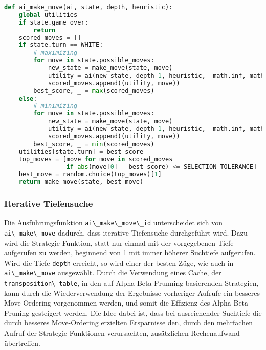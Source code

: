 \begin{lstlisting}[language=Python]
def ai_make_move(ai, state, depth, heuristic):
    global utilities
    if state.game_over:
        return
    scored_moves = []
    if state.turn == WHITE:
        # maximizing
        for move in state.possible_moves:
            new_state = make_move(state, move)
            utility = ai(new_state, depth-1, heuristic, -math.inf, math.inf)
            scored_moves.append((utility, move))
        best_score, _ = max(scored_moves)
    else:
        # minimizing
        for move in state.possible_moves:
            new_state = make_move(state, move)
            utility = ai(new_state, depth-1, heuristic, -math.inf, math.inf)
            scored_moves.append((utility, move))
        best_score, _ = min(scored_moves)
    utilities[state.turn] = best_score
    top_moves = [move for move in scored_moves
                 if abs(move[0] - best_score) <= SELECTION_TOLERANCE]
    best_move = random.choice(top_moves)[1]
    return make_move(state, best_move)
\end{lstlisting}

\hypertarget{iterative-tiefensuche}{%
\subsubsection{Iterative Tiefensuche}\label{iterative-tiefensuche}}

Die Ausführungsfunktion \passthrough{\lstinline!ai\_make\_move\_id!}
unterscheidet sich von \passthrough{\lstinline!ai\_make\_move!} dadurch,
dass iterative Tiefensuche durchgeführt wird. Dazu wird die
Strategie-Funktion, statt nur einmal mit der vorgegebenen Tiefe
aufgerufen zu werden, beginnend von 1 mit immer höherer Suchtiefe
aufgerufen. Wird die Tiefe \passthrough{\lstinline!depth!} erreicht, so
wird einer der besten Züge, wie auch in
\passthrough{\lstinline!ai\_make\_move!} ausgewählt. Durch die
Verwendung eines Cache, der
\passthrough{\lstinline!transposition\_table!}, in den auf Alpha-Beta
Prunning basierenden Strategien, kann durch die Wiederverwendung der
Ergebnisse vorheriger Aufrufe ein besseres Move-Ordering vorgenommen
werden, und somit die Effizienz des Alpha-Beta Pruning gesteigert
werden. Die Idee dabei ist, dass bei ausreichender Suchtiefe die durch
besseres Move-Ordering erzielten Ersparnisse den, durch den mehrfachen
Aufruf der Strategie-Funktionen verursachten, zusätzlichen Rechenaufwand
übertreffen.

